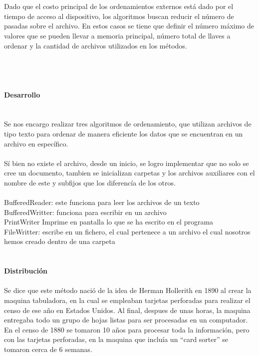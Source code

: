 \documentclass[12pt,a4paper]{article}
\begin{document}
	\\
	\\
	Dado que el costo principal de los ordenamientos externos está dado por el tiempo de acceso al dispositivo, los algoritmos buscan reducir el número de pasadas sobre el archivo. 
En estos casos se tiene que definir el número máximo de valores que se pueden llevar a memoria principal, número total de llaves a ordenar y la cantidad de archivos utilizados en los métodos.
	\\
	\\
	\\
	\\
	\\
	\huge \textbf {Desarrollo}
	\\
	\\
	\normalsize 
	\\Se nos encargo realizar tres algoritmos de ordenamiento, que utilizan archivos de tipo texto para ordenar de manera eficiente los datos que se encuentran en un archivo en específico.
	\\
	\\
	Sí bien no existe el archivo, desde un inicio, se logro implementar que no solo se cree un documento, tambien se inicializan carpetas y los archivos auxiliares con el nombre de este y subfijos que los diferencía de los otros.
	\\
	\\
	BufferedReader: este funciona para leer los archivos de un texto 
	\\BufferedWritter: funciona para escribir en un archivo 
\\PrintWriter Imprime en pantalla lo que se ha escrito en el programa 
\\FileWritter: escribe en un fichero, el cual pertenece a un archivo el cual nosotros hemos creado dentro de una carpeta 
	\\
	\\
	\\
	\newpage
	\huge \textbf {Distribución}
	\\
	\\
	\normalsize Se dice que este método nació de la idea de Herman Hollerith en 1890 al crear la maquina tabuladora, en la cual se empleaban tarjetas perforadas para realizar el censo de ese año en Estados Unidos.
Al final, despues de unas horas, la maquina entregaba todo un grupo de hojas listas para ser procesadas en un computador.
En el censo de 1880 se tomaron 10 años para procesar toda la información, pero con las tarjetas perforadas, en la maquina que incluía un “card sorter” se tomaron cerca de 6 semanas.
\end{document}
